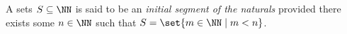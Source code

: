 \guard

\begin{defn}
\label{defn:initialSegmentOfTheNaturals}
  A sets $S\subseteq \NN$ is said to be an \emph{initial segment of the naturals} provided there exists some $n\in\NN$ such that $S = \set{ m\in\NN\mid m<n}$.
\end{defn}
